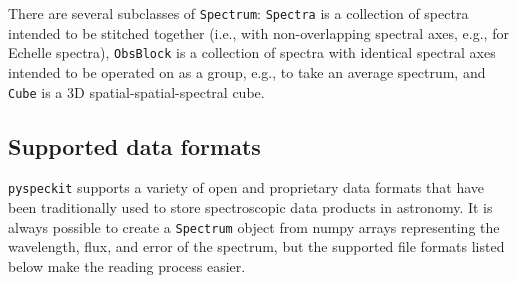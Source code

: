 \documentclass[twocolumn,linenumbers]{aastex63}
\newcommand{\pyspeckit}{\texttt{pyspeckit}\xspace}
\begin{document}
There are several subclasses of \texttt{Spectrum}: \texttt{Spectra}
is a collection of spectra intended to be stitched together (i.e., with
non-overlapping spectral axes, e.g., for Echelle spectra), \texttt{ObsBlock} is a collection of spectra
with identical spectral axes intended to be operated on as a group, e.g., to
take an average spectrum, and \texttt{Cube} is a 3D spatial-spatial-spectral
cube.

\subsection{Supported data formats}

\pyspeckit supports a variety of open and proprietary data formats that have
been traditionally used to store spectroscopic data products in astronomy. 
It is always possible to create a \texttt{Spectrum} object from numpy \citep{vanderWalt2011,Harris2020} arrays
representing the wavelength, flux, and error of the spectrum, but
the supported file formats listed below make the reading process easier.
\end{document}
